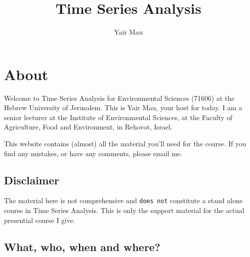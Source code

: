 \documentclass[
  letterpaper,
  DIV=11,
  numbers=noendperiod,
  oneside]{scrreprt}
\title{Time Series Analysis}
\author{Yair Mau}
\date{}
\renewcommand*\contentsname{Table of contents}
\newcommand\contentsname{Table of contents}
\begin{document}
\maketitle
\ifdefined\Shaded\renewenvironment{Shaded}{\begin{tcolorbox}[interior hidden, borderline west={3pt}{0pt}{shadecolor}, boxrule=0pt, enhanced, sharp corners, breakable, frame hidden]}{\end{tcolorbox}}\fi

\renewcommand*\contentsname{Table of contents}
{
\hypersetup{linkcolor=}
\setcounter{tocdepth}{2}
\tableofcontents
}

\hypertarget{about}{%
\chapter*{About}\label{about}}


Welcome to Time Series Analysis for Environmental Sciences (71606) at
the Hebrew University of Jerusalem. This is Yair Mau, your host for
today. I am a senior lecturer at the Institute of Environmental
Sciences, at the Faculty of Agriculture, Food and Environment, in
Rehovot, Israel.

This website contains (almost) all the material you'll need for the
course. If you find any mistakes, or have any comments, please email me.

\hypertarget{disclaimer}{%
\section*{Disclaimer}\label{disclaimer}}


The material here is not comprehensive and \texttt{does\ not} constitute
a stand alone course in Time Series Analysis. This is only the support
material for the actual presential course I give.

\hypertarget{what-who-when-and-where}{%
\section*{What, who, when and where?}\label{what-who-when-and-where}}

\end{document}
